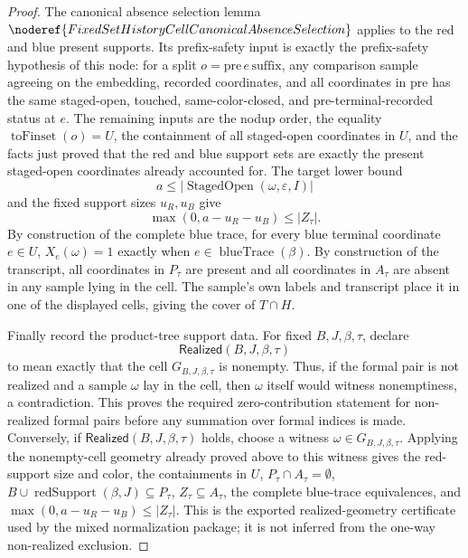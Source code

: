 \begin{proof}
The canonical absence selection lemma
\(\noderef{FixedSetHistoryCellCanonicalAbsenceSelection}\) applies to the red
and blue present supports.  Its prefix-safety input is exactly the
prefix-safety hypothesis of this node: for a split \(o=\mathrm{pre}\, e\,
\mathrm{suffix}\), any comparison sample agreeing on the embedding, recorded
coordinates, and all coordinates in \(\mathrm{pre}\) has the same
staged-open, touched, same-color-closed, and pre-terminal-recorded status at
\(e\).  The remaining inputs are the nodup order, the equality
\(\operatorname{toFinset}(o)=U\), the containment of all staged-open
coordinates in \(U\), and the facts just proved that the red and blue support
sets are exactly the present staged-open coordinates already accounted for.
The target lower bound
\[
a\le |\operatorname{StagedOpen}(\omega,\varepsilon,I)|
\]
and the fixed support sizes \(u_R,u_B\) give
\[
\max(0,a-u_R-u_B)\le |Z_\tau|.
\]
By construction of the complete blue trace, for every blue terminal
coordinate \(e\in U\), \(X_e(\omega)=1\) exactly when
\(e\in\operatorname{blueTrace}(\beta)\).  By
construction of the transcript, all coordinates in \(P_\tau\) are present and
all coordinates in \(A_\tau\) are absent in any sample lying in the cell.
The sample's own labels and transcript place it in one of the displayed
cells, giving the cover of \(T\cap H\).

Finally record the product-tree support data.  For fixed \(B,J,\beta,\tau\),
declare
\[
\mathsf{Realized}(B,J,\beta,\tau)
\]
to mean exactly that the cell \(G_{B,J,\beta,\tau}\) is nonempty.  Thus, if
the formal pair is not realized and a sample \(\omega\) lay in the cell, then
\(\omega\) itself would witness nonemptiness, a contradiction.  This proves
the required zero-contribution statement for non-realized formal pairs before
any summation over formal indices is made.
Conversely, if \(\mathsf{Realized}(B,J,\beta,\tau)\) holds, choose a witness
\(\omega\in G_{B,J,\beta,\tau}\).  Applying the nonempty-cell geometry
already proved above to this witness gives the red-support size and color,
the containments in \(U\), \(P_\tau\cap A_\tau=\emptyset\),
\(B\cup\operatorname{redSupport}(\beta,J)\subseteq P_\tau\),
\(Z_\tau\subseteq A_\tau\), the complete blue-trace equivalences, and
\(\max(0,a-u_R-u_B)\le |Z_\tau|\).  This is the exported
realized-geometry certificate used by the mixed normalization package; it is
not inferred from the one-way non-realized exclusion.


\end{proof}
